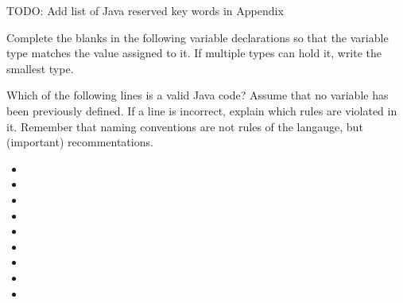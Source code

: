 TODO: Add list of Java reserved key words in Appendix

\exercisesection

\begin{exercise}
Complete the blanks in the following variable declarations so that the variable type matches the value assigned to it. If multiple types can hold it, write the smallest type.
\item {}
\item {}
\item {}
\item {}
\item {}
\item {}
\end{exercise}

\begin{exercise}
Which of the following lines is a valid Java code? Assume that no variable has been previously defined. If a line is incorrect, explain which rules are violated in it. Remember that naming conventions are not rules of the langauge, but (important) recommentations.
\begin{itemize}
\item {}
\item {}
\item {}
\item {}
\item {}
\item {}
\item {}
\item {}
\item {}
\end{itemize}
\end{exercise}

